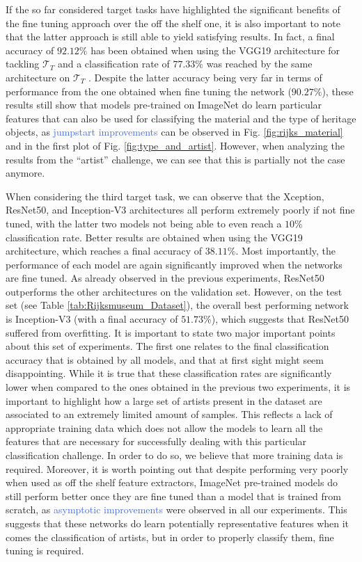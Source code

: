 If the so far considered target tasks have highlighted the significant benefits of the fine tuning approach over the off the shelf one, it is also important to note that the latter approach is still able to yield satisfying results. In fact, a final accuracy of $92.12\%$ has been obtained when using the VGG19 architecture for tackling $\mathcal{T}_T$  and a classification rate of $77.33\%$ was reached by the same architecture on $\mathcal{T}_T$ . Despite the latter accuracy being very far in terms of performance from the one obtained when fine tuning the network ($90.27\%$), these results still show that models pre-trained on ImageNet do learn particular features that can also be used for classifying the material and the type of heritage objects, as \textcolor{RoyalBlue}{jumpstart improvements} can be observed in Fig. \ref{fig:rijks_material} and in the first plot of Fig. \ref{fig:type_and_artist}.  However, when analyzing the results from the ``artist'' challenge, we can see that this is partially not the case anymore.




When considering the third target task, we can observe that the Xception, ResNet50, and Inception-V3 architectures all perform extremely poorly if not fine tuned, with the latter two models not being able to even reach a $10\%$ classification rate. Better results are obtained when using the VGG19 architecture, which reaches a final accuracy of $38.11\%$. Most importantly, the performance of each model are again significantly improved when the networks are fine tuned. As already observed in the previous experiments, ResNet50 outperforms the other architectures on the validation set. However, on the test set (see Table \ref{tab:Rijksmuseum_Dataset}), the overall best performing network is Inception-V3 (with a final accuracy of $51.73\%$), which suggests that ResNet50 suffered from overfitting. It is important to state two major important points about this set of experiments. The first one relates to the final classification accuracy that is obtained by all models, and that at first sight might seem disappointing. While it is true that these classification rates are significantly lower when compared to the ones obtained in the previous two experiments, it is important to highlight how a large set of artists present in the dataset are associated to an extremely limited amount of samples. This reflects a lack of appropriate training data which does not allow the models to learn all the features that are necessary for successfully dealing with this particular classification challenge. In order to do so, we believe that more training data is required. Moreover, it is worth pointing out that despite performing very poorly when used as off the shelf feature extractors, ImageNet pre-trained models do still perform better once they are fine tuned than a model that is trained from scratch, as \textcolor{RoyalBlue}{asymptotic improvements} were observed in all our experiments. This suggests that these networks do learn potentially representative features when it comes the classification of artists, but in order to properly classify them, fine tuning is required.

